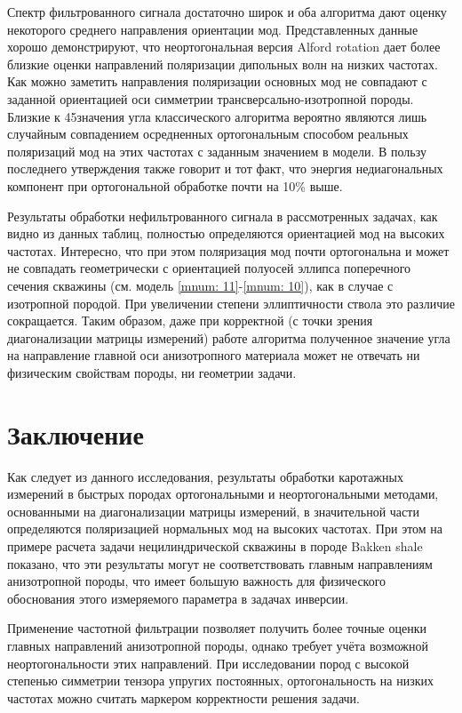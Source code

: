 \documentclass[a4paper,11pt]{article}
\begin{document}
Спектр фильтрованного сигнала достаточно широк и оба алгоритма дают оценку некоторого среднего направления ориентации мод. Представленных данные хорошо демонстрируют, что неортогональная версия Alford rotation дает более близкие оценки направлений поляризации дипольных волн на низких частотах. Как можно заметить направления поляризации основных мод не совпадают с заданной ориентацией оси симметрии трансверсально-изотропной породы. Близкие к 45\textdegree значения угла классического алгоритма вероятно являются лишь случайным совпадением осредненных ортогональным способом реальных поляризаций мод на этих частотах с заданным значением в модели. В пользу последнего утверждения также говорит и тот факт, что энергия недиагональных компонент при ортогональной обработке почти на 10\% выше. 

Результаты обработки нефильтрованного сигнала в рассмотренных задачах, как видно из данных таблиц, полностью определяются ориентацией мод на высоких частотах. Интересно, что при этом поляризация мод почти ортогональна и может не совпадать геометрически с ориентацией полуосей эллипса поперечного сечения скважины (см. модель \ref{mnum: 11}-\ref{mnum: 10}), как в случае с изотропной породой. При увеличении степени эллиптичности ствола это различие сокращается. Таким образом, даже при корректной (с точки зрения диагонализации матрицы измерений) работе алгоритма полученное значение угла на направление главной оси анизотропного материала может не отвечать ни физическим свойствам породы, ни геометрии задачи. 
\clearpage

\section{Заключение}

Как следует из данного исследования, результаты обработки каротажных измерений в быстрых породах ортогональными и неортогональными методами, основанными на диагонализации матрицы измерений, в значительной части определяются поляризацией нормальных мод на высоких частотах. При этом на примере расчета задачи нецилиндрической скважины в породе Bakken shale показано, что эти результаты могут не соответствовать главным направлениям анизотропной породы, что имеет большую важность для физического обоснования этого измеряемого параметра в задачах инверсии.

Применение частотной фильтрации позволяет получить более точные оценки главных направлений анизотропной породы, однако требует учёта возможной неортогональности этих направлений. При исследовании пород с высокой степенью симметрии тензора упругих постоянных, ортогональность на низких частотах можно считать маркером корректности решения задачи. 
\end{document}
